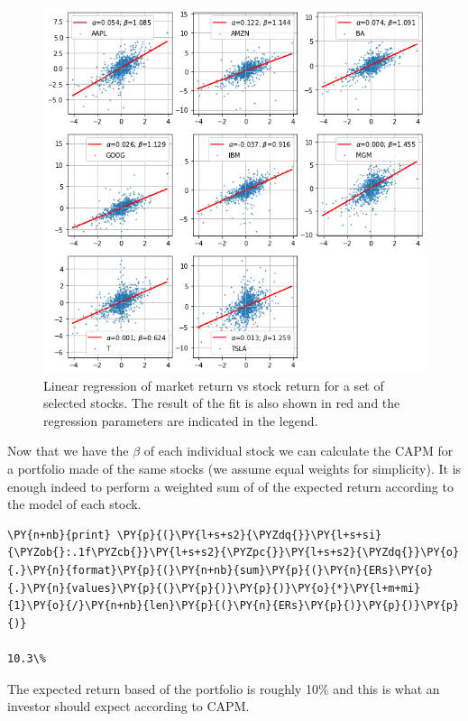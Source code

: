 \begin{figure}[htb]
	\centering
	\includegraphics[width=.8\textwidth]{figures/capm_fit.png}
	\caption{Linear regression of market return vs stock return for a set of selected stocks. The result of the fit is also shown in red and the regression parameters are indicated in the legend.}
	\label{fig:capm_fit}
\end{figure}

Now that we have the $\beta$ of each individual stock we can calculate the CAPM for a portfolio made of the same stocks (we assume equal weights for simplicity).
It is enough indeed to perform a weighted sum of of the expected return according to the model of each stock.

\begin{tcolorbox}[breakable, size=fbox, boxrule=1pt, pad at break*=1mm,colback=cellbackground, colframe=cellborder]
\begin{Verbatim}[commandchars=\\\{\}]
\PY{n+nb}{print} \PY{p}{(}\PY{l+s+s2}{\PYZdq{}}\PY{l+s+si}{\PYZob{}:.1f\PYZcb{}}\PY{l+s+s2}{\PYZpc{}}\PY{l+s+s2}{\PYZdq{}}\PY{o}{.}\PY{n}{format}\PY{p}{(}\PY{n+nb}{sum}\PY{p}{(}\PY{n}{ERs}\PY{o}{.}\PY{n}{values}\PY{p}{(}\PY{p}{)}\PY{p}{)}\PY{o}{*}\PY{l+m+mi}{1}\PY{o}{/}\PY{n+nb}{len}\PY{p}{(}\PY{n}{ERs}\PY{p}{)}\PY{p}{)}\PY{p}{)}

10.3\%
\end{Verbatim}
\end{tcolorbox}

The expected return based of the portfolio is roughly 10\% and this is what an investor should expect according to CAPM.

